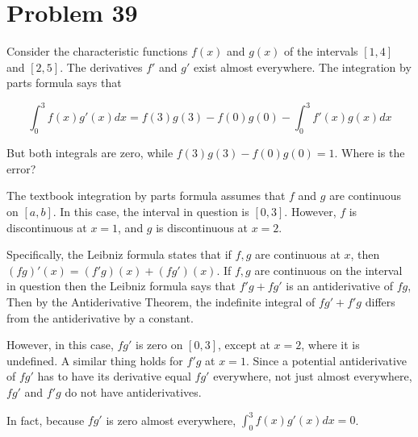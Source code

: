 \documentclass{article}
\begin{document}
\section*{Problem 39}

Consider the characteristic functions $f(x)$ and $g(x)$ of the intervals $[1, 4]$ and $[2, 5]$. The derivatives $f'$ and $g'$ exist almost everywhere. The integration by parts formula says that

\[
\int_0^3 f(x)g'(x) dx = f(3)g(3) - f(0)g(0) - \int_0^3 f'(x)g(x)dx
\]

But both integrals are zero, while $f(3)g(3) - f(0)g(0) = 1$. Where is the error?

The textbook integration by parts formula assumes that $f$ and $g$ are continuous on $[a, b]$. In this case, the interval in question is $[0, 3]$. However, $f$ is discontinuous at $x=1$, and $g$ is discontinuous at $x = 2$.

Specifically, the Leibniz formula states that if $f, g$ are continuous at $x$, then $(fg)'(x) = (f'g)(x) + (fg')(x)$. If $f, g$ are continuous on the interval in question then the Leibniz formula says that $f'g + fg'$ is an antiderivative of $fg$, Then by the Antiderivative Theorem, the indefinite integral of $fg' + f'g$ differs from the antiderivative by a constant.

However, in this case, $fg'$ is zero on $[0, 3]$, except at $x=2$, where it is undefined. A similar thing holds for $f'g$ at $x=1$. Since a potential antiderivative of $fg'$ has to have its derivative equal $fg'$ everywhere, not just almost everywhere, $fg'$ and $f'g$ do not have antiderivatives.

In fact, because $fg'$ is zero almost everywhere, $\int_0^3 f(x)g'(x) dx = 0$.
\end{document}
